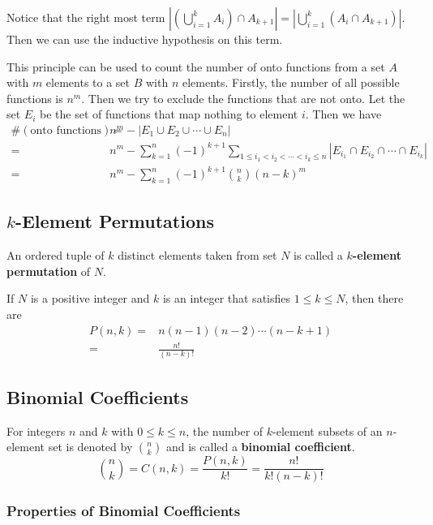 \documentclass[a4paper,12pt]{article}
\begin{document}
Notice that the right most term $\left| \left( \bigcup_{i=1}^{k} A_i \right) \cap A_{k+1} \right| = \left| \bigcup_{i=1}^{k} (A_i \cap A_{k+1}) \right|$.
Then we can use the inductive hypothesis on this term.

This principle can be used to count the number of onto functions from a set $A$ with $m$ elements to a set $B$ with $n$ elements.
Firstly, the number of all possible functions is $n^m$.
Then we try to exclude the functions that are not onto.
Let the set $E_i$ be the set of functions that map nothing to element $i$.
Then we have
\begin{align*}
	\#(\text{onto functions}) =& n^m - |E_1 \cup E_2 \cup \cdots \cup E_n| \\
	=& n^m - \sum_{k=1}^{n} (-1)^{k+1} \sum_{1 \leq i_1 < i_2 < \cdots < i_k \leq n} \left| E_{i_1} \cap E_{i_2} \cap \cdots \cap E_{i_k} \right| \\
	=& n^m - \sum_{k=1}^{n} (-1)^{k+1} \binom{n}{k} (n-k)^m
\end{align*}

\subsection{$k$-Element Permutations}

An ordered tuple of $k$ distinct elements taken from set $N$ is called a \textbf{$k$-element permutation} of $N$.

If $N$ is a positive integer and $k$ is an integer that satisfies $1 \leq k \leq N$, then there are
\begin{align*}
	P(n,k) =& n(n-1)(n-2) \cdots (n-k+1) \\
	=& \frac{n!}{(n-k)!}
\end{align*}

\subsection{Binomial Coefficients}

For integers $n$ and $k$ with $0 \leq k \leq n$, the number of $k$-element subsets of an $n$-element set is denoted by $\binom{n}{k}$ and is called a \textbf{binomial coefficient}.
\begin{equation*}
	\binom{n}{k} = C(n,k) = \frac{P(n,k)}{k!} = \frac{n!}{k!(n-k)!}
\end{equation*}

\subsubsection{Properties of Binomial Coefficients}
\end{document}
